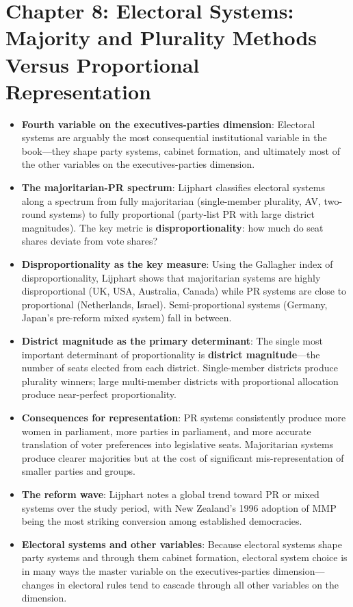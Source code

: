 \documentclass[12pt]{article}
\begin{document}
\section{Chapter 8: Electoral Systems: Majority and Plurality Methods Versus Proportional Representation}

\begin{itemize}[leftmargin=*, itemsep=4pt]
    \item \textbf{Fourth variable on the executives-parties dimension}: Electoral systems are arguably the most consequential institutional variable in the book---they shape party systems, cabinet formation, and ultimately most of the other variables on the executives-parties dimension.
    \item \textbf{The majoritarian-PR spectrum}: Lijphart classifies electoral systems along a spectrum from fully majoritarian (single-member plurality, AV, two-round systems) to fully proportional (party-list PR with large district magnitudes). The key metric is \textbf{disproportionality}: how much do seat shares deviate from vote shares?
    \item \textbf{Disproportionality as the key measure}: Using the Gallagher index of disproportionality, Lijphart shows that majoritarian systems are highly disproportional (UK, USA, Australia, Canada) while PR systems are close to proportional (Netherlands, Israel). Semi-proportional systems (Germany, Japan's pre-reform mixed system) fall in between.
    \item \textbf{District magnitude as the primary determinant}: The single most important determinant of proportionality is \textbf{district magnitude}---the number of seats elected from each district. Single-member districts produce plurality winners; large multi-member districts with proportional allocation produce near-perfect proportionality.
    \item \textbf{Consequences for representation}: PR systems consistently produce more women in parliament, more parties in parliament, and more accurate translation of voter preferences into legislative seats. Majoritarian systems produce clearer majorities but at the cost of significant mis-representation of smaller parties and groups.
    \item \textbf{The reform wave}: Lijphart notes a global trend toward PR or mixed systems over the study period, with New Zealand's 1996 adoption of MMP being the most striking conversion among established democracies.
    \item \textbf{Electoral systems and other variables}: Because electoral systems shape party systems and through them cabinet formation, electoral system choice is in many ways the master variable on the executives-parties dimension---changes in electoral rules tend to cascade through all other variables on the dimension.
\end{itemize}
\end{document}
